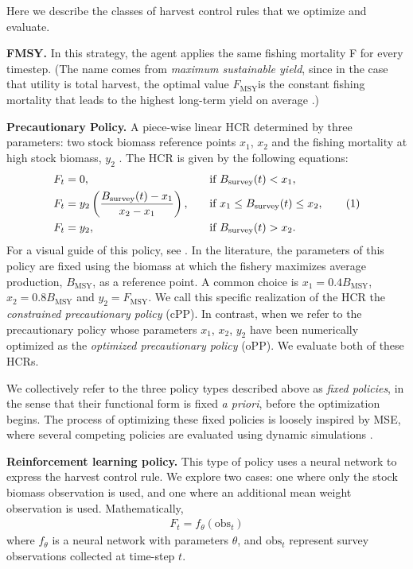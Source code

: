 \documentclass[floatfix,nofootinbib,longbibliography,notitlepage]{revtex4-2}
\newcommand\numberthis{\addtocounter{equation}{1}\tag{\theequation}}
\def\textfmsy{$F_{\text{MSY}}$}
\def\fmsy{F_{\text{MSY}}}
\def\bmsy{B_{\text{MSY}}}
\def\bsurv{B_{\text{survey}}}
\def\obs{\text{obs}}
\begin{document}
Here we describe the classes of harvest control rules that we optimize and evaluate.

\textbf{FMSY.} 
In this strategy, the agent applies the same fishing mortality F for every timestep. 
(The name comes from \emph{maximum sustainable yield}, since in the case that utility is total harvest, the optimal value \textfmsy is the constant fishing mortality that leads to the highest long-term yield on average \cite{hilborn-walters-1992}.)

\textbf{Precautionary Policy.}
A piece-wise linear HCR determined by three parameters: 
two stock biomass reference points $x_1$, $x_2$  and the fishing mortality at high stock biomass,  $y_2$ . 
The HCR is given by the following equations:
\begin{alignat*}{2}
    F_t &= 0, \quad && \text{if } \bsurv(t) < x_1,\\
    F_t &= y_2 \left(\frac{\bsurv(t) - x_1}{x_2 - x_1}\right), \quad && \text{if } x_1 \leq \bsurv(t) \leq x_2, \numberthis\\
    F_t &= y_2, \quad && \text{if } \bsurv(t) > x_2.
\end{alignat*}
For a visual guide of this policy, see \cite[Fig.~1]{dfo2006}. 
In the literature, the parameters of this policy are fixed using the biomass at which the fishery maximizes average production, $\bmsy$, as a reference point. 
A common choice is $x_1=0.4 \bmsy$, $x_2=0.8 \bmsy$ and $y_2=\fmsy$. 
We call this specific realization of the HCR the \emph{constrained precautionary policy} (cPP). 
In contrast, when we refer to the precautionary policy whose parameters $x_1$, $x_2$, $y_2$ have been numerically optimized as the \emph{optimized precautionary policy} (oPP). 
We evaluate both of these HCRs.

We collectively refer to the three policy types described above as \emph{fixed policies}, in the sense that their functional form is fixed \emph{a priori}, before the optimization begins. 
The process of optimizing these fixed policies is loosely inspired by MSE, where several competing policies are evaluated using dynamic simulations \cite{punt-mse}.

\textbf{Reinforcement learning policy.} 
This type of policy uses a neural network to express the harvest control rule. 
We explore two cases: one where only the stock biomass observation is used, and one where an additional mean weight observation is used. 
Mathematically,
\begin{align}
    F_t = f_\theta(\obs_t)
\end{align}
where $f_\theta$ is a neural network with parameters $\theta$, and $\obs_t$ represent survey observations collected at time-step $t$. 
\end{document}
